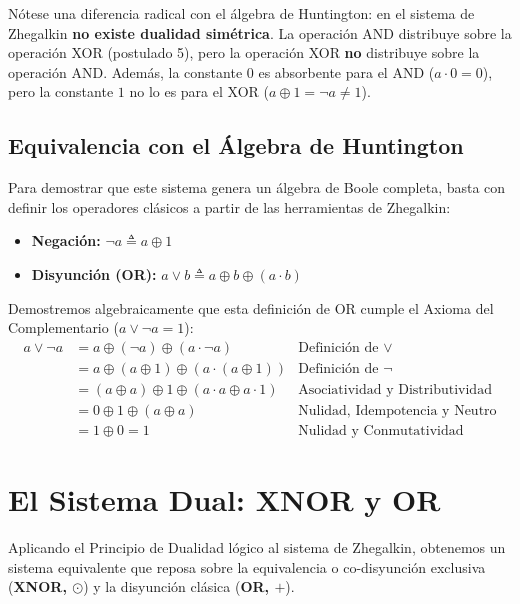 Nótese una diferencia radical con el álgebra de Huntington: en el sistema de Zhegalkin \textbf{no existe dualidad simétrica}. La operación AND distribuye sobre la operación XOR (postulado 5), pero la operación XOR \textbf{no} distribuye sobre la operación AND. Además, la constante $0$ es absorbente para el AND ($a \cdot 0 = 0$), pero la constante $1$ no lo es para el XOR ($a \oplus 1 = \neg a \neq 1$).

\subsection{Equivalencia con el Álgebra de Huntington}

Para demostrar que este sistema genera un álgebra de Boole completa, basta con definir los operadores clásicos a partir de las herramientas de Zhegalkin:

\begin{itemize}
    \item \textbf{Negación:} $\neg a \triangleq a \oplus 1$
    \item \textbf{Disyunción (OR):} $a \vee b \triangleq a \oplus b \oplus (a \cdot b)$
\end{itemize}

Demostremos algebraicamente que esta definición de OR cumple el Axioma del Complementario ($a \vee \neg a = 1$):
\begin{align*}
a \vee \neg a &= a \oplus (\neg a) \oplus (a \cdot \neg a) & \text{Definición de } \vee \\
&= a \oplus (a \oplus 1) \oplus (a \cdot (a \oplus 1)) & \text{Definición de } \neg \\
&= (a \oplus a) \oplus 1 \oplus (a \cdot a \oplus a \cdot 1) & \text{Asociatividad y Distributividad} \\
&= 0 \oplus 1 \oplus (a \oplus a) & \text{Nulidad, Idempotencia y Neutro} \\
&= 1 \oplus 0 = 1 & \text{Nulidad y Conmutatividad}
\end{align*}

\section{El Sistema Dual: XNOR y OR}

Aplicando el Principio de Dualidad lógico al sistema de Zhegalkin, obtenemos un sistema equivalente que reposa sobre la equivalencia o co-disyunción exclusiva (\textbf{XNOR, $\odot$}) y la disyunción clásica (\textbf{OR, $+$}).

